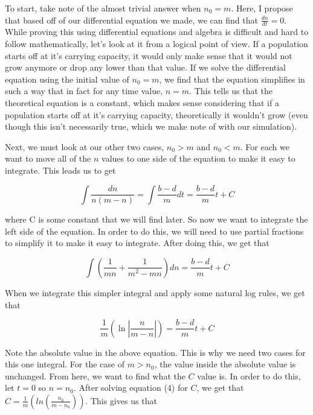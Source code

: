 \documentclass[titlepage]{article}\usepackage[]{graphicx}\usepackage[]{color}
\begin{document}
To start, take note of the almost trivial answer when \(n_0 = m\). Here, I propose that based off of our differential equation we made, we can find that \(\frac{dn}{dt} = 0\). While proving this using differential equations and algebra is difficult and hard to follow mathematically, let's look at it from a logical point of view. If a population starts off at it's carrying capacity, it would only make sense that it would not grow anymore or drop any lower than that value. If we solve the differential equation using the initial value of \(n_0 = m\), we find that the equation simplifies in such a way that in fact for any time value, \(n=m\). This tells us that the theoretical equation is a constant, which makes sense considering that if a population starts off at it's carrying capacity, theoretically it wouldn't grow (even though this isn't necessarily true, which we make note of with our simulation).

Next, we must look at our other two cases, \(n_0 > m\) and \(n_0 < m\). For each we want to move all of the \(n\) values to one side of the equation to make it easy to integrate. This leads us to get 

\begin{equation}
\int \frac{dn}{n(m-n)} = \int \frac{b-d}{m} dt = \frac{b-d}{m} t + C
\end{equation}

\noindent where C is some constant that we will find later. So now we want to integrate the left side of the equation. In order to do this, we will need to use partial fractions to simplify it to make it easy to integrate. After doing this, we get that 

\begin{equation}
\int\left(\frac{1}{mn}+\frac{1}{m^2-mn}\right)dn = \frac{b-d}{m} t + C
\end{equation}

\noindent When we integrate this simpler integral and apply some natural log rules, we get that 

\begin{equation}
\frac{1}{m}\left(\ln\left|\frac{n}{m-n}\right|\right) = \frac{b-d}{m} t + C
\end{equation}

\noindent Note the absolute value in the above equation. This is why we need two cases for this one integral. For the case of \(m > n_0\), the value inside the absolute value is unchanged. From here, we want to find what the \(C\) value is. In order to do this, let \(t=0\) so \(n=n_0\). After solving equation (4) for \(C\), we get that \(C = \frac{1}{m}(ln(\frac{n_0}{m-n_0}))\). This gives us that 
\end{document}
